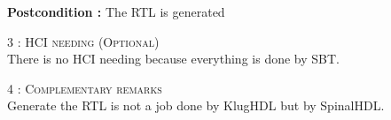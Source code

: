 \begin{flushleft}
    \textbf{\large Postcondition :} The RTL is generated

    \BlackLine
    \textsc{\Large 3 : HCI needing (Optional)}\\[0.3cm]

    There is no HCI needing because everything is done by SBT.

    \BlackLine
    \textsc{\Large 4 : Complementary remarks}\\[0.3cm]

    Generate the RTL is not a job done by KlugHDL but by SpinalHDL.

\end{flushleft}
